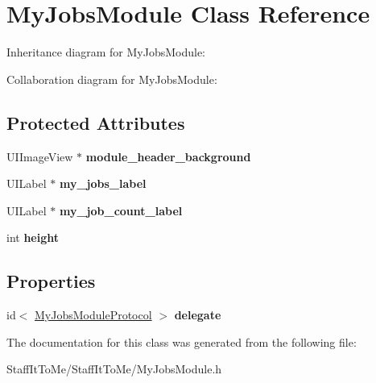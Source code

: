 \hypertarget{interface_my_jobs_module}{
\section{\-My\-Jobs\-Module \-Class \-Reference}
\label{interface_my_jobs_module}
}


\-Inheritance diagram for \-My\-Jobs\-Module\-:


\-Collaboration diagram for \-My\-Jobs\-Module\-:
\subsection*{\-Protected \-Attributes}
\begin{DoxyCompactItemize}
\item 
\hypertarget{interface_my_jobs_module_a5447755836691417a6aa4794f04b7942}{
\-U\-I\-Image\-View $\ast$ {\bfseries module\-\_\-header\-\_\-background}}
\label{interface_my_jobs_module_a5447755836691417a6aa4794f04b7942}

\item 
\hypertarget{interface_my_jobs_module_a82912583da9f66529cf7c9593e8e0c36}{
\-U\-I\-Label $\ast$ {\bfseries my\-\_\-jobs\-\_\-label}}
\label{interface_my_jobs_module_a82912583da9f66529cf7c9593e8e0c36}

\item 
\hypertarget{interface_my_jobs_module_a77c55c609e5ce61ce04114a04be8dc15}{
\-U\-I\-Label $\ast$ {\bfseries my\-\_\-job\-\_\-count\-\_\-label}}
\label{interface_my_jobs_module_a77c55c609e5ce61ce04114a04be8dc15}

\item 
\hypertarget{interface_my_jobs_module_afdeb3124b9e7976b8e1b7b54552fc486}{
int {\bfseries height}}
\label{interface_my_jobs_module_afdeb3124b9e7976b8e1b7b54552fc486}

\end{DoxyCompactItemize}
\subsection*{\-Properties}
\begin{DoxyCompactItemize}
\item 
\hypertarget{interface_my_jobs_module_ac5368b0b0a8b10ad6f215fd044572392}{
id$<$ \hyperlink{protocol_my_jobs_module_protocol-p}{\-My\-Jobs\-Module\-Protocol} $>$ {\bfseries delegate}}
\label{interface_my_jobs_module_ac5368b0b0a8b10ad6f215fd044572392}

\end{DoxyCompactItemize}


\-The documentation for this class was generated from the following file\-:\begin{DoxyCompactItemize}
\item 
\-Staff\-It\-To\-Me/\-Staff\-It\-To\-Me/\-My\-Jobs\-Module.\-h\end{DoxyCompactItemize}
